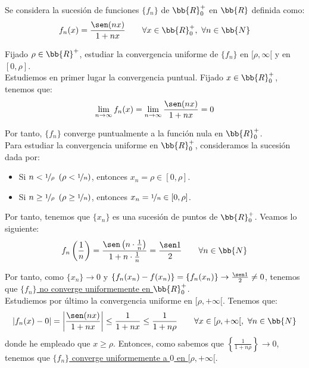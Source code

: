 \begin{ejercicio}
    Se considera la sucesión de funciones $\{f_n\}$ de $\bb{R}_0^+$ en $\bb{R}$ definida como:
    \begin{equation*}
        f_n(x) = \frac{\sen (nx)}{1+nx} \qquad \forall x\in \bb{R}_0^+,~\forall n\in \bb{N}
    \end{equation*}

    Fijado $\rho\in \bb{R}^+$, estudiar la convergencia uniforme de $\{f_n\}$ en $[\rho, \infty[$ y en $[0,\rho]$.\\

    Estudiemos en primer lugar la convergencia puntual. Fijado $x\in \bb{R}_0^+$, tenemos que:
    \begin{equation*}
        \lim_{n\to \infty} f_n(x) = \lim_{n\to \infty} \frac{\sen (nx)}{1+nx} = 0
    \end{equation*}

    Por tanto, $\{f_n\}$ converge puntualmente a la función nula en $\bb{R}_0^+$.\\

    Para estudiar la convergencia uniforme en $\bb{R}_0^+$, consideramos la sucesión dada por:
    \begin{itemize}
        \item Si $n < \nicefrac{1}{\rho}~\left(\rho < \nicefrac{1}{n}\right)$, entonces $x_n = \rho \in [0,\rho]$.
        \item Si $n \geq \nicefrac{1}{\rho}~\left(\rho \geq \nicefrac{1}{n}\right)$, entonces $x_n = \nicefrac{1}{n}\in [0,\rho]$.
    \end{itemize}
    Por tanto, tenemos que $\{x_n\}$ es una sucesión de puntos de $\bb{R}_0^+$. Veamos lo siguiente:
    \begin{equation*}
        f_n\left(\frac{1}{n}\right) = \frac{\sen\left(n\cdot \frac{1}{n}\right)}{1+n\cdot \frac{1}{n}} = \frac{\sen 1}{2} \qquad \forall n\in \bb{N}
    \end{equation*}

    Por tanto, como $\{x_n\}\to 0$ y $\{f_n(x_n)-f(x_n)\}=\{f_n(x_n)\}\to \frac{\sen 1}{2}\neq 0$, tenemos que \ul{$\{f_n\}$ no converge uniformemente en $\bb{R}_0^+$}.\\

    Estudiemos por último la convergencia uniforme en $[\rho,+\infty[$. Tenemos que:
    \begin{equation*}
        \left|f_n(x)-0\right| = \left|\frac{\sen (nx)}{1+nx}\right| \leq \frac{1}{1+nx} \leq \frac{1}{1+n\rho} \qquad \forall x\in [\rho,+\infty[,~\forall n\in \bb{N}
    \end{equation*}
    donde he empleado que $x\geq \rho$. Entonces, como sabemos que $\left\{\frac{1}{1+n\rho}\right\}\to 0$, tenemos que \ul{$\{f_n\}$ converge uniformemente a $0$ en $[\rho,+\infty[$}.
\end{ejercicio}
